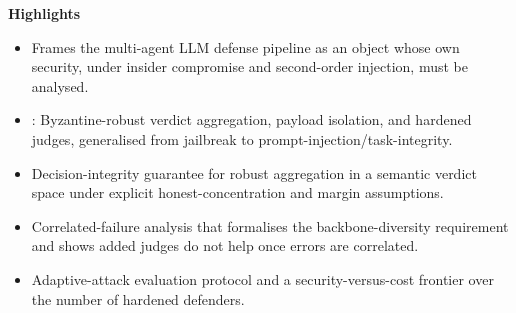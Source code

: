 \vspace{-0.4em}
\noindent\textbf{Highlights}
\begin{itemize}[leftmargin=1.3em,itemsep=1pt,topsep=2pt]
  \item Frames the multi-agent LLM defense pipeline as an object whose own security,
        under insider compromise and second-order injection, must be analysed.
  \item \Aegis: Byzantine-robust verdict aggregation, payload isolation, and hardened
        judges, generalised from jailbreak to prompt-injection/task-integrity.
  \item Decision-integrity guarantee for robust aggregation in a semantic verdict space
        under explicit honest-concentration and margin assumptions.
  \item Correlated-failure analysis that formalises the backbone-diversity requirement
        and shows added judges do not help once errors are correlated.
  \item Adaptive-attack evaluation protocol and a security-versus-cost frontier over the
        number of hardened defenders.
\end{itemize}

